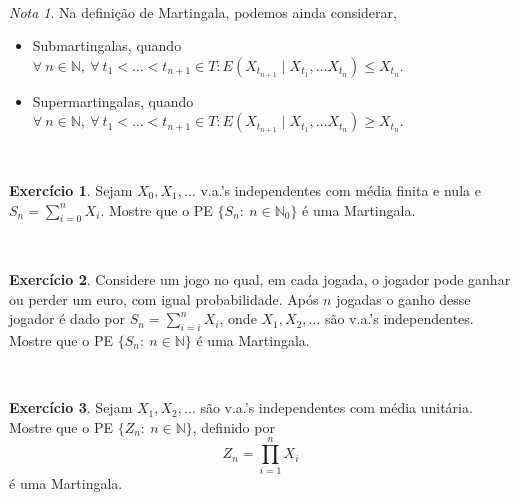 \documentclass[
  11pt,
  a4paper,
]{book}
\theoremstyle{definition}
\theoremstyle{definition}
\theoremstyle{definition}
\newtheorem{exercise}{Exercício}[chapter]
\theoremstyle{definition}
\theoremstyle{remark}
\newtheorem*{remark}{Nota }
\begin{document}
\(\,\)

\begin{remark}

Na definição de Martingala, podemos ainda considerar,

\begin{itemize}
\item
  Submartingalas, quando \(\forall ~n \in \mathbb{N}, ~\forall ~t_1< \ldots < t_{n+1} \in T: E(X_{t_{n+1}} \mid X_{t_1}, \ldots X_{t_n}) \leq X_{t_n}\).
\item
  Supermartingalas, quando \(\forall ~n \in \mathbb{N}, ~\forall ~t_1< \ldots < t_{n+1} \in T: E(X_{t_{n+1}} \mid X_{t_1}, \ldots X_{t_n}) \geq X_{t_n}\).
\end{itemize}

\end{remark}

\(\,\)

\begin{exercise}
\leavevmode

Sejam \(X_0, X_1, \dots\) v.a.'s independentes com média finita e nula e \(S_n=\sum\limits_{i=0}^{n}X_i\). Mostre que o PE \(\{S_n: ~n \in \mathbb{N}_0\}\) é uma Martingala.

\end{exercise}

\(\,\)

\begin{exercise}
\leavevmode

Considere um jogo no qual, em cada jogada, o jogador pode ganhar ou perder um euro, com igual probabilidade. Após \(n\) jogadas o ganho desse jogador é dado por \(S_n=\sum\limits_{i=i}^{n}X_i\), onde \(X_1, X_2, \dots\) são v.a.'s independentes. Mostre que o PE \(\{S_n: ~n \in \mathbb{N}\}\) é uma Martingala.

\end{exercise}

\(\,\)

\begin{exercise}
\leavevmode

Sejam \(X_1, X_2, \dots\) são v.a.'s independentes com média unitária. Mostre que o PE \(\{Z_n: ~n \in \mathbb{N}\}\), definido por
\[Z_n=\prod\limits_{i=1}^{n}X_i\]
é uma Martingala.

\end{exercise}

\(\,\)
\end{document}
